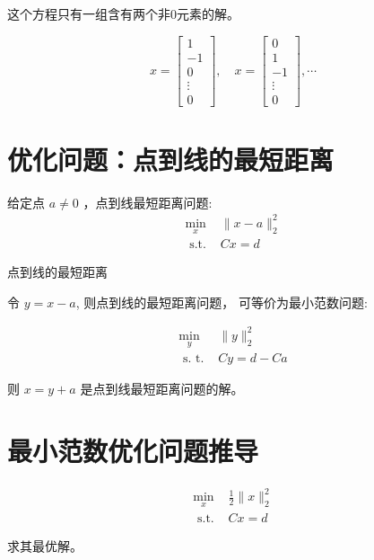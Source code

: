 这个方程只有一组含有两个非0元素的解。

$$
x=\left[\begin{array}{c}
1 \\
-1 \\
0 \\
\vdots \\
0
\end{array}\right], \quad x=\left[\begin{array}{c}
0 \\
1 \\
-1 \\
\vdots \\
0
\end{array}\right], \cdots
$$

\section{优化问题：点到线的最短距离}

\begin{problem}
    给定点 $ a \neq 0 $ ，点到线最短距离问题:
$$
\begin{array}{ll}
\min _{x} & \|x-a\|_{2}^{2} \\
\text { s.t. } & C x=d
\end{array}
$$

\end{problem}

\begin{FigureCenter}{点到线的最短距离}
    
\end{FigureCenter}


令 $ y=x-a $, 则点到线的最短距离问题， 可等价为最小范数问题:

\begin{problem}
    $$
\begin{array}{ll}
\min _{y} & \|y\|_{2}^{2} \\
\text { s. t. } & C y=d-C a
\end{array}
$$
\end{problem}

则 $ x=y+a $ 是点到线最短距离问题的解。

\section{最小范数优化问题推导}

\begin{problem}
    $$
\begin{array}{ll}
\min _{x}& \frac{1}{2}\|x\|_{2}^{2} \\
\text { s.t. }& C x=d
\end{array}
$$

求其最优解。
\end{problem}

